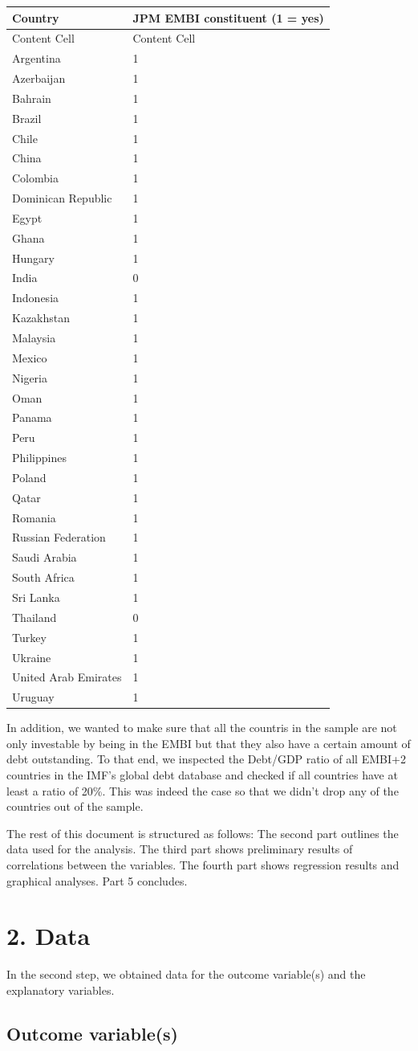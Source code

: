 \documentclass[11pt,]{article}
\begin{document}
\begin{longtable}[]{@{}ll@{}}
\toprule
Country & JPM EMBI constituent (1 = yes)\tabularnewline
\midrule
\endhead
Content Cell & Content Cell\tabularnewline
Argentina & 1\tabularnewline
Azerbaijan & 1\tabularnewline
Bahrain & 1\tabularnewline
Brazil & 1\tabularnewline
Chile & 1\tabularnewline
China & 1\tabularnewline
Colombia & 1\tabularnewline
Dominican Republic & 1\tabularnewline
Egypt & 1\tabularnewline
Ghana & 1\tabularnewline
Hungary & 1\tabularnewline
India & 0\tabularnewline
Indonesia & 1\tabularnewline
Kazakhstan & 1\tabularnewline
Malaysia & 1\tabularnewline
Mexico & 1\tabularnewline
Nigeria & 1\tabularnewline
Oman & 1\tabularnewline
Panama & 1\tabularnewline
Peru & 1\tabularnewline
Philippines & 1\tabularnewline
Poland & 1\tabularnewline
Qatar & 1\tabularnewline
Romania & 1\tabularnewline
Russian Federation & 1\tabularnewline
Saudi Arabia & 1\tabularnewline
South Africa & 1\tabularnewline
Sri Lanka & 1\tabularnewline
Thailand & 0\tabularnewline
Turkey & 1\tabularnewline
Ukraine & 1\tabularnewline
United Arab Emirates & 1\tabularnewline
Uruguay & 1\tabularnewline
\bottomrule
\end{longtable}

In addition, we wanted to make sure that all the countris in the sample
are not only investable by being in the EMBI but that they also have a
certain amount of debt outstanding. To that end, we inspected the
Debt/GDP ratio of all EMBI+2 countries in the IMF's global debt database
and checked if all countries have at least a ratio of 20\%. This was
indeed the case so that we didn't drop any of the countries out of the
sample.

The rest of this document is structured as follows: The second part
outlines the data used for the analysis. The third part shows
preliminary results of correlations between the variables. The fourth
part shows regression results and graphical analyses. Part 5 concludes.

\hypertarget{data}{%
\section{2. Data}\label{data}}

In the second step, we obtained data for the outcome variable(s) and the
explanatory variables.

\hypertarget{outcome-variables}{%
\subsection{Outcome variable(s)}\label{outcome-variables}}
\end{document}
